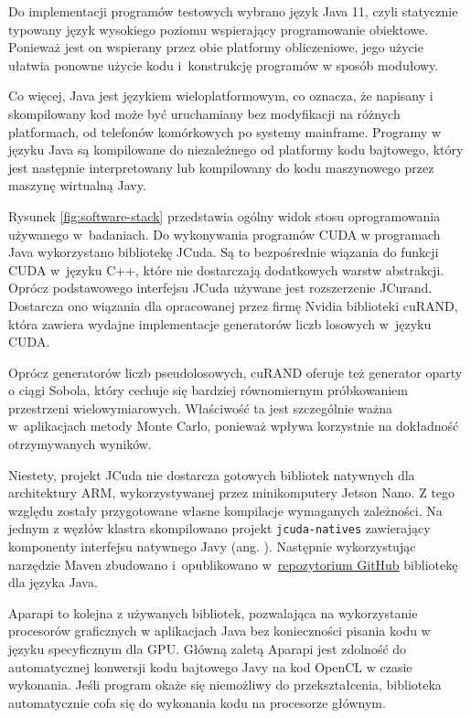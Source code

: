 Do implementacji programów testowych wybrano język Java 11, czyli statycznie typowany język
wysokiego poziomu wspierający programowanie obiektowe. Ponieważ jest on wspierany przez obie
platformy obliczeniowe, jego użycie ułatwia ponowne użycie kodu i~konstrukcję programów w
sposób modułowy.

Co więcej, Java jest językiem wieloplatformowym, co oznacza, że napisany i skompilowany kod może
być uruchamiany bez modyfikacji na różnych platformach, od telefonów komórkowych po systemy
mainframe. Programy w języku Java są kompilowane do niezależnego od platformy kodu bajtowego,
który jest następnie interpretowany lub kompilowany do kodu maszynowego przez maszynę wirtualną Javy.

Rysunek \ref{fig:software-stack} przedstawia ogólny widok stosu oprogramowania używanego w~badaniach.
Do wykonywania programów CUDA w programach Java wykorzystano bibliotekę JCuda. Są to bezpośrednie
wiązania do funkcji CUDA w~języku C++, które nie dostarczają dodatkowych warstw abstrakcji. Oprócz
podstawowego interfejsu JCuda używane jest rozszerzenie JCurand. Dostarcza ono wiązania dla
opracowanej przez firmę Nvidia biblioteki cuRAND, która zawiera wydajne implementacje generatorów
liczb losowych w~języku CUDA.

Oprócz generatorów liczb pseudolosowych, cuRAND oferuje też generator oparty o ciągi Sobola, który
cechuje się bardziej równomiernym próbkowaniem przestrzeni wielowymiarowych. Właściwość ta jest
szczególnie ważna w~aplikacjach metody Monte Carlo, ponieważ wpływa korzystnie na dokładność
otrzymywanych wyników.

Niestety, projekt JCuda nie dostarcza gotowych bibliotek natywnych dla architektury ARM,
wykorzystywanej przez minikomputery Jetson Nano. Z tego względu zostały przygotowane własne
kompilacje wymaganych zależności. Na jednym z węzłów klastra skompilowano projekt
\lstinline{jcuda-natives} zawierający komponenty interfejsu natywnego Javy (ang.
). Następnie wykorzystując narzędzie Maven zbudowano i~opublikowano
w~\href{https://github.com/users/kmolski/packages?repo_name=masters-thesis}{repozytorium GitHub}
bibliotekę dla języka Java.

Aparapi to kolejna z używanych bibliotek, pozwalająca na wykorzystanie procesorów graficznych w
aplikacjach Java bez konieczności pisania kodu w języku specyficznym dla GPU. Główną zaletą
Aparapi jest zdolność do automatycznej konwersji kodu bajtowego Javy na kod OpenCL w czasie
wykonania. Jeśli program okaże się niemożliwy do przekształcenia, biblioteka automatycznie
cofa się do wykonania kodu na procesorze głównym.

